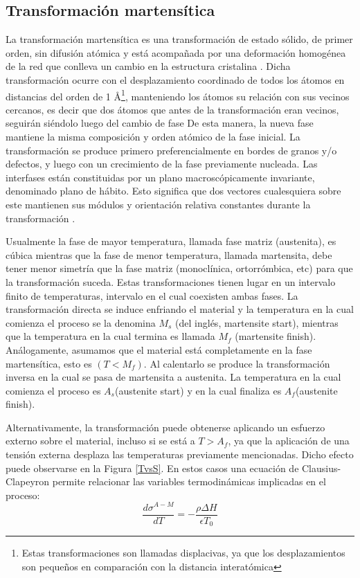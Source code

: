 \documentclass[12pt]{article}
\theoremstyle{definition}
\theoremstyle{remark}
\begin{document}
\subsection{Transformación martensítica}

La transformación martensítica es una transformación de estado sólido, de primer orden, sin difusión atómica y está acompañada por una deformación homogénea de la red que conlleva un cambio en la estructura cristalina \cite{Santamarta}. Dicha transformación ocurre con el desplazamiento coordinado de todos los átomos en distancias del orden de 1 \AA \footnote{Estas transformaciones son llamadas displacivas, ya que los desplazamientos son pequeños en comparación con la distancia interatómica}, manteniendo los átomos su relación con sus vecinos cercanos, es decir que dos átomos que antes de la transformación eran vecinos, seguirán siéndolo luego del cambio de fase\cite{HTSMA} De esta manera, la nueva fase mantiene la misma composición y orden atómico de la fase inicial. La transformación se produce primero preferencialmente en bordes de granos y/o defectos, y luego con un crecimiento de la fase previamente nucleada. Las interfases están constituidas por un plano macroscópicamente invariante, denominado plano de hábito. Esto significa que dos vectores cualesquiera sobre este mantienen sus módulos y orientación relativa constantes durante la transformación \cite{Santamarta}.

Usualmente la fase de mayor temperatura, llamada fase matriz (austenita), es cúbica mientras que la fase de menor temperatura, llamada martensita, debe tener menor simetría que la fase matriz (monoclínica, ortorrómbica, etc) para que la transformación suceda\cite{Malvasio}. Estas transformaciones tienen lugar en un intervalo finito de temperaturas, intervalo en el cual coexisten ambas fases. La transformación directa se induce enfriando el material y la temperatura en la cual comienza el proceso se la denomina $M_s$ (del inglés, martensite start), mientras que la temperatura en la cual termina es llamada $M_f$ (martensite finish). Análogamente, asumamos que el material está completamente en la fase martensítica, esto es $(T < M_f)$. Al calentarlo se produce la transformación inversa en la cual se pasa de martensita a austenita. La temperatura en la cual comienza el proceso es $A_s$(austenite start) y en la cual finaliza es $A_f$(austenite finish).\cite{Santamarta}

Alternativamente, la transformación puede obtenerse aplicando un esfuerzo externo sobre el material, incluso si se está a $T > A_f$, ya que la aplicación de una tensión externa desplaza las temperaturas previamente mencionadas. Dicho efecto puede observarse en la Figura \ref{TvsS}. En estos casos una ecuación de Clausius-Clapeyron permite relacionar las variables termodinámicas implicadas en el proceso:
\begin{equation}
	\frac{d\sigma^{A-M}}{dT} = -\frac{\rho \Delta H}{\epsilon T_0}
\end{equation}
\end{document}
